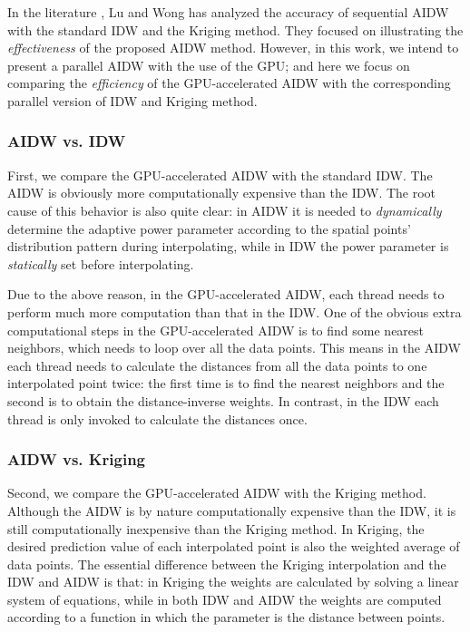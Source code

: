 \documentclass[fleqn,11pt]{wlscirep}
\begin{document}
In the literature \cite{32}, Lu and Wong has analyzed the accuracy 
of sequential AIDW with the standard IDW and the Kriging method. They 
focused on illustrating the \textit{effectiveness} of the proposed AIDW method. However, in this 
work, we intend to present a parallel AIDW with the use of the GPU; and here 
we focus on comparing the \textit{efficiency} of the GPU-accelerated AIDW with the 
corresponding parallel version of IDW and Kriging method.

\subsubsection{AIDW vs. IDW}

First, we compare the GPU-accelerated AIDW with the standard IDW. The AIDW 
is obviously more computationally expensive than the IDW. The root cause of 
this behavior is also quite clear: in AIDW it is needed to \textit{dynamically} determine the 
adaptive power parameter according to the spatial points' distribution 
pattern during interpolating, while in IDW the power parameter is 
\textit{statically} set before interpolating. 

Due to the above reason, in the GPU-accelerated AIDW, each thread needs to 
perform much more computation than that in the IDW. One of the obvious extra 
computational steps in the GPU-accelerated AIDW is to find some nearest 
neighbors, which needs to loop over all the data points. This means in the 
AIDW each thread needs to calculate the distances from all the data points 
to one interpolated point twice: the first time is to find the nearest 
neighbors and the second is to obtain the distance-inverse weights. In 
contrast, in the IDW each thread is only invoked to calculate the distances 
once.

\subsubsection{AIDW vs. Kriging}

Second, we compare the GPU-accelerated AIDW with the Kriging method. 
Although the AIDW is by nature computationally expensive than the IDW, it is 
still computationally inexpensive than the Kriging method. In Kriging, the 
desired prediction value of each interpolated point is also the weighted 
average of data points. The essential difference between the Kriging 
interpolation and the IDW and AIDW is that: in Kriging the weights are 
calculated by solving a linear system of equations, while in both IDW and 
AIDW the weights are computed according to a function in which the parameter 
is the distance between points. 
\end{document}
